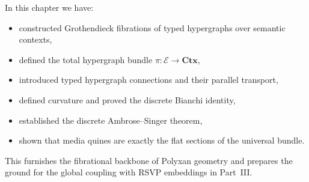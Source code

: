 In this chapter we have:
\begin{itemize}
\item constructed Grothendieck fibrations of typed hypergraphs over semantic contexts,
\item defined the total hypergraph bundle $\pi : \mathcal{E}\to\mathbf{Ctx}$,
\item introduced typed hypergraph connections and their parallel transport,
\item defined curvature and proved the discrete Bianchi identity,
\item established the discrete Ambrose--Singer theorem,
\item shown that media quines are exactly the flat sections of the universal bundle.
\end{itemize}

This furnishes the fibrational backbone of Polyxan geometry and prepares the
ground for the global coupling with RSVP embeddings in Part~III.
